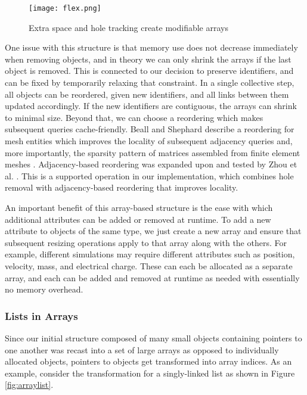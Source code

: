 \begin{figure}
\begin{center}
\texttt{[image: flex.png]}
\caption{Extra space and hole tracking create modifiable arrays}
\label{fig:flex}
\end{center}
\end{figure}

One issue with this structure is that memory use does
not decrease immediately when removing objects, and in theory we can
only shrink the arrays if the last object is removed.
This is connected to our decision to preserve identifiers,
and can be fixed by temporarily relaxing that constraint.
In a single collective step, all objects can be reordered,
given new identifiers, and all links between them updated
accordingly.
If the new identifiers are contiguous, the arrays can shrink
to minimal size.
Beyond that, we can choose a reordering which
makes subsequent queries cache-friendly.
Beall and Shephard describe a reordering for mesh entities which
improves the locality of subsequent adjacency queries
and, more importantly, the sparsity pattern of
matrices assembled from finite element meshes \cite{beall1997general}.
Adjacency-based reordering was expanded upon and
tested by Zhou et al. \cite{zhou2010adjacency}.
This is a supported operation in our implementation,
which combines hole removal with adjacency-based reordering
that improves locality.

An important benefit of this array-based structure is the
ease with which additional attributes can be added or removed
at runtime.
To add a new attribute to objects of the same type, we just
create a new array and ensure that subsequent resizing
operations apply to that array along with the others.
For example, different simulations may require different
attributes such as position, velocity, mass, and electrical charge.
These can each be allocated as a separate array,
and each can be added and removed at runtime as needed
with essentially no memory overhead.

\subsubsection{Lists in Arrays}
\label{sec:lia}

Since our initial structure composed of many small objects containing pointers
to one another was recast into a set of large arrays
as opposed to individually allocated objects,
pointers to objects get transformed into array indices.
As an example, consider the transformation for a singly-linked
list as shown in Figure \ref{fig:arraylist}.

